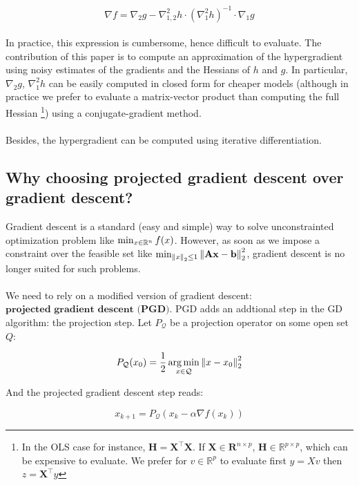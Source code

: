 \documentclass[a4paper,10pt]{article}
\theoremstyle{definition}
\begin{document}
\begin{equation*}
    \nabla f = \nabla_2 g - \nabla^2_{1,2}h \cdot (\nabla_1^2 h)^{-1} \cdot \nabla_1 g
\end{equation*}
\\
In practice, this expression is cumbersome, hence difficult to evaluate. The contribution of this paper is to compute an approximation of the hypergradient using noisy estimates
of the gradients and the Hessians of $h$ and $g$. In particular, $\nabla_2 g$, $\nabla^2_1 h$ can be
easily computed in closed form for cheaper models (although in practice we prefer to evaluate
a matrix-vector product than computing the full Hessian \footnote{In the OLS case for instance, $\mathbf{H} = \mathbf{X^\top X}$. If $\mathbf{X} \in \mathbf{R}^{n \times p}$,
$\mathbf{H} \in \mathbb{R}^{p \times p}$, which can be expensive to evaluate. We prefer for $v \in \mathbb{R}^{p}$ to evaluate
first $y=Xv$ then $z=\mathbf{X^\top}y$}) using a conjugate-gradient method.
\\
\\
Besides, the hypergradient can be computed using iterative differentiation.

\subsection*{Why choosing projected gradient descent over gradient descent?}

Gradient descent is a standard (easy and simple) way to solve unconstrainted optimization
problem like $\min_{x \in \mathbb{R}^n} f(x)$. However, as soon as we impose a constraint over
the feasible set like $\min_{\left \lVert x \right \rVert_2 \leq 1} \left \lVert \mathbf{Ax-b} \right \rVert_2^2$, gradient descent is no longer suited for such problems.
\\
\\
We need to rely on a modified version of gradient descent: $\textbf{projected gradient descent (PGD)}$. PGD adds an addtional step
in the GD algorithm: the projection step. Let $P_{\mathcal{Q}}$ be a projection operator on some open set $Q$:

\begin{equation*}
    P_{\mathcal{Q}}(x_0) = \frac{1}{2}\operatorname*{arg\,min}_{x \in \mathcal{Q}} \left \lVert x - x_0 \right \rVert_2^2
\end{equation*}

And the projected gradient descent step reads:

\begin{equation*}
    x_{k+1} = P_{\mathcal{Q}}(x_k - \alpha \nabla f(x_k))
\end{equation*}
\end{document}
